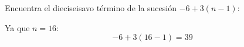 Encuentra el dieciseisavo término de la sucesión $-6+3(n-1)$:

\begin{solutionbox}{1.6cm}
    Ya que $n=16$:
    \[-6+3(16-1)=39\]
\end{solutionbox}